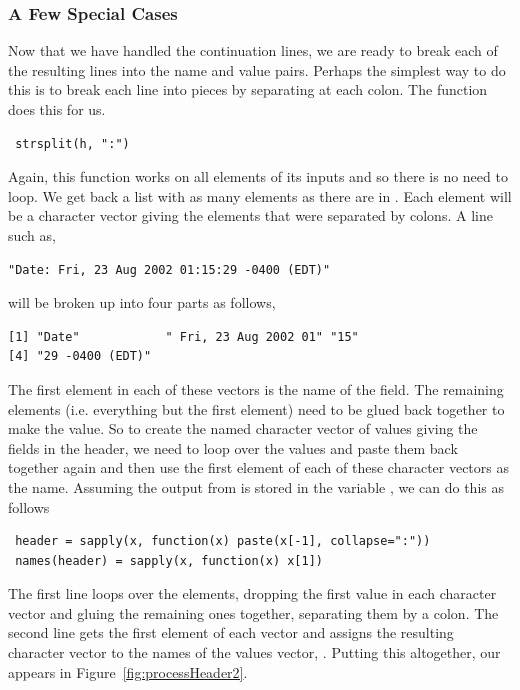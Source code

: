 \subsubsection{A Few Special Cases}
Now that we have handled the continuation lines,
we are ready to break each of the resulting 
lines into the name and value
pairs.
Perhaps the simplest way to do this is
to break each line into pieces by separating
at each colon. The
 function
does this for us.
\begin{verbatim}
 strsplit(h, ":")
\end{verbatim}
Again, this function works on all elements
of its inputs and so there is no need to loop.
We get back a list with as many elements
as there are in .
Each element will be a character vector
giving the elements that were separated by colons.
A line such as,
\begin{verbatim}
"Date: Fri, 23 Aug 2002 01:15:29 -0400 (EDT)"                                
\end{verbatim}
will be broken up into four parts as follows,
\begin{verbatim}
[1] "Date"            " Fri, 23 Aug 2002 01" "15"                  
[4] "29 -0400 (EDT)"      
\end{verbatim}
The first element in each of these vectors is the
name of the field.
The remaining elements (i.e. everything but the first element)
need to be glued back together to make the
value.
So to create the named character vector of values
giving the fields in the header, we
need to loop over the values and paste them back
together again and then use the first element
of each of these character vectors as the name.
Assuming the output from 
is stored in the variable ,
we can do this as follows
\begin{verbatim}
 header = sapply(x, function(x) paste(x[-1], collapse=":"))
 names(header) = sapply(x, function(x) x[1])
\end{verbatim}
The first line loops over the elements, dropping the first value in
each character vector and gluing the remaining ones together,
separating them by a colon.  The second line gets the first element of
each vector and assigns the resulting character vector to the names of
the values vector, .
Putting this altogether, our 
appears in Figure~\ref{fig:processHeader2}.

